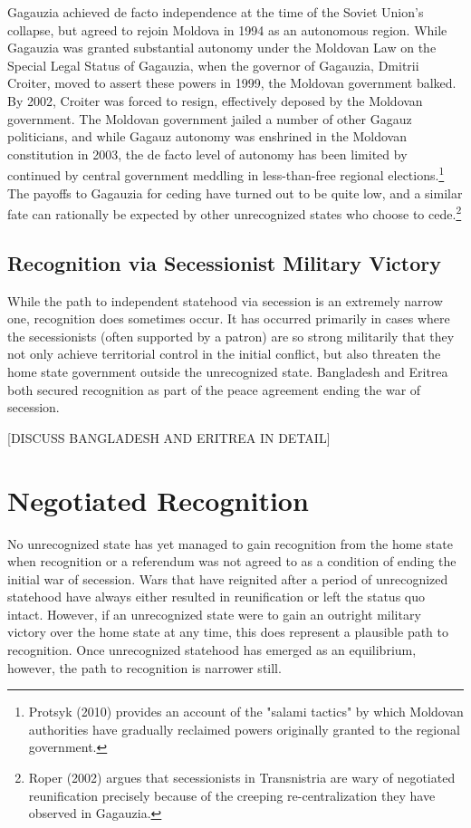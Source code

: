 \documentclass[12pt,letterpaper, notitlepage]{article}
\begin{document}
Gagauzia achieved de facto independence at the time of the Soviet Union's collapse, but agreed to rejoin Moldova in 1994 as an autonomous region.  While Gagauzia was granted substantial autonomy under the Moldovan Law on the Special Legal Status of Gagauzia, when the governor of Gagauzia, Dmitrii Croiter, moved to assert these powers in 1999, the Moldovan government balked.  By 2002, Croiter was forced to resign, effectively deposed by the Moldovan government.  The Moldovan government jailed a number of other Gagauz politicians, and while Gagauz autonomy was enshrined in the Moldovan constitution in 2003, the de facto level of autonomy has been limited by continued by central government meddling in less-than-free regional elections.\footnote{Protsyk (2010) provides an account of the "salami tactics" by which Moldovan authorities have gradually reclaimed powers originally granted to the regional government.} The payoffs to Gagauzia for ceding have turned out to be quite low, and a similar fate can rationally be expected by other unrecognized states who choose to cede.\footnote{Roper (2002) argues that secessionists in Transnistria are wary of negotiated reunification precisely because of the creeping re-centralization they have observed in Gagauzia.}

\subsection*{Recognition via Secessionist Military Victory}
While the path to independent statehood via secession is an extremely narrow one, recognition does sometimes occur. It has occurred primarily in cases where the secessionists (often supported by a patron) are so strong militarily that they not only achieve territorial control in the initial conflict, but also threaten the home state government outside the unrecognized state.  Bangladesh and Eritrea both secured recognition as part of the peace agreement ending the war of secession.  

[DISCUSS BANGLADESH AND ERITREA IN DETAIL]


\section*{Negotiated Recognition}
No unrecognized state has yet managed to gain recognition from the home state when recognition or a referendum was not agreed to as a condition of ending the initial war of secession. Wars that have reignited after a period of unrecognized statehood have always either resulted in reunification or left the status quo intact.  However, if an unrecognized state were to gain an outright military victory over the home state at any time, this does represent a plausible path to recognition. Once unrecognized statehood has emerged as an equilibrium, however, the path to recognition is narrower still.
\end{document}
